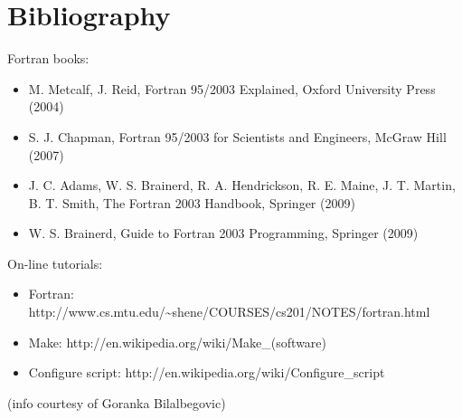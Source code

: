\documentclass[12pt,a4paper]{article}
\begin{document}
\section{Bibliography}

Fortran books:
\begin{itemize}
\item 
M. Metcalf, J. Reid, Fortran 95/2003 Explained, Oxford University Press (2004) 
\item
S. J. Chapman, Fortran 95/2003 for Scientists and Engineers, McGraw Hill (2007) 
\item
J. C. Adams, W. S. Brainerd, R. A. Hendrickson, R. E. Maine, J. T. Martin,
B. T. Smith, The Fortran 2003 Handbook, Springer (2009) 
\item
W. S. Brainerd, Guide to Fortran 2003 Programming, Springer (2009)
\end{itemize}
On-line tutorials:
\begin{itemize}
\item Fortran:
http://www.cs.mtu.edu/\~{}shene/COURSES/cs201/NOTES/fortran.html
\item Make:  
http://en.wikipedia.org/wiki/Make\_(software)
\item Configure script:
http://en.wikipedia.org/wiki/Configure\_script
\end{itemize}
(info courtesy of Goranka Bilalbegovic)
\end{document}
